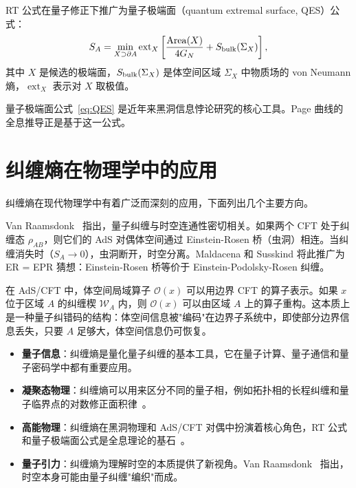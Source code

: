 \begin{theorem}[量子极端面公式]\label{thm:QES}
RT 公式在量子修正下推广为量子极端面（quantum extremal surface, QES）公式：
\begin{equation}\label{eq:QES}
    S_A = \min_{X \supset \partial A} \operatorname{ext}_X \left[\frac{\operatorname{Area}(X)}{4G_N} + S_{\rm bulk}(\Sigma_X)\right],
\end{equation}
其中 $X$ 是候选的极端面，$S_{\rm bulk}(\Sigma_X)$ 是体空间区域 $\Sigma_X$ 中物质场的 von Neumann 熵，$\operatorname{ext}_X$ 表示对 $X$ 取极值。
\end{theorem}

\begin{note}
量子极端面公式~\eqref{eq:QES} 是近年来黑洞信息悖论研究的核心工具。Page 曲线的全息推导正是基于这一公式。
\end{note}

\section{纠缠熵在物理学中的应用}

纠缠熵在现代物理学中有着广泛而深刻的应用，下面列出几个主要方向。

\begin{example}[ER = EPR 猜想]
Van Raamsdonk~\cite{VanRaamsdonk2010} 指出，量子纠缠与时空连通性密切相关。如果两个 CFT 处于纠缠态 $\rho_{AB}$，则它们的 AdS 对偶体空间通过 Einstein-Rosen 桥（虫洞）相连。当纠缠消失时（$S_A \to 0$），虫洞断开，时空分离。Maldacena 和 Susskind 将此推广为 ER = EPR 猜想：Einstein-Rosen 桥等价于 Einstein-Podolsky-Rosen 纠缠。
\end{example}

\begin{definition}[量子纠错码与纠缠楔]
在 AdS/CFT 中，体空间局域算子 $\mathcal{O}(x)$ 可以用边界 CFT 的算子表示。如果 $x$ 位于区域 $A$ 的纠缠楔 $\mathcal{W}_A$ 内，则 $\mathcal{O}(x)$ 可以由区域 $A$ 上的算子重构。这本质上是一种量子纠错码的结构：体空间信息被"编码"在边界子系统中，即使部分边界信息丢失，只要 $A$ 足够大，体空间信息仍可恢复。
\end{definition}

\begin{itemize}
    \item \textbf{量子信息}：纠缠熵是量化量子纠缠的基本工具，它在量子计算、量子通信和量子密码学中都有重要应用。
    \item \textbf{凝聚态物理}：纠缠熵可以用来区分不同的量子相，例如拓扑相的长程纠缠和量子临界点的对数修正面积律~\cite{Calabrese2004}。
    \item \textbf{高能物理}：纠缠熵在黑洞物理和 AdS/CFT 对偶中扮演着核心角色，RT 公式和量子极端面公式是全息理论的基石~\cite{Ryu2006}。
    \item \textbf{量子引力}：纠缠熵为理解时空的本质提供了新视角。Van Raamsdonk~\cite{VanRaamsdonk2010} 指出，时空本身可能由量子纠缠"编织"而成。
\end{itemize}

